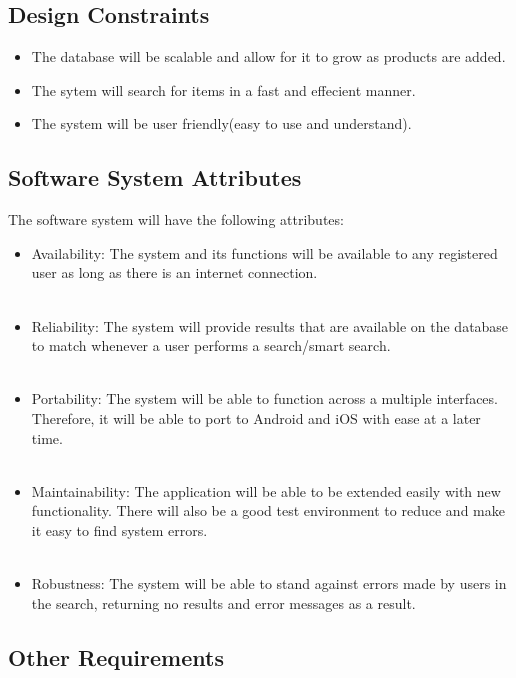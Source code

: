 \documentclass[a4paper,10pt]{article}
\begin{document}
{\begin{itemize}
	\subsection{Design Constraints}
	\begin{itemize}
		\item The database will be scalable and allow for it to grow as products are added.
		\item The sytem will search for items in a fast and effecient manner.
		\item The system will be user friendly(easy to use and understand).
	\end{itemize}

	\subsection{Software System Attributes}
	The software system will have the following attributes:
		
		\begin{itemize}
		\item Availability: The system and its functions will be available to any registered user as long as there is an internet connection. 
\\\\
		\item Reliability: The system will provide results that are available on the database to match whenever a user performs a search/smart search.
\\\\
		\item Portability: The system will be able to function across a multiple interfaces. Therefore, it will be able to port to Android and iOS with ease at a later time. 
\\\\
		\item Maintainability: The application will be able to be extended easily with new functionality. There will also be a good test environment to reduce and make it easy to find system errors.  
\\\\
		\item Robustness: The system will be able to stand against errors made by users in the search, returning no results and error messages as a result.
		\end{itemize}
        
	\subsection{Other Requirements}


\end{itemize}}
\end{document}
